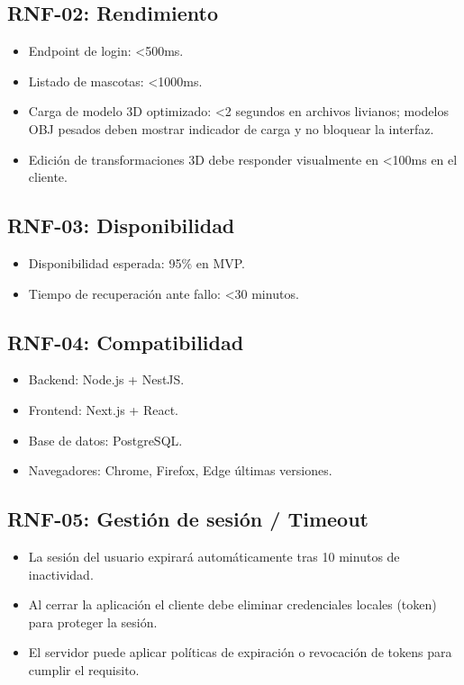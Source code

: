 \documentclass[12pt,a4paper]{article}
\begin{document}
\subsection{RNF-02: Rendimiento}
\begin{itemize}[leftmargin=*]
    \item Endpoint de login: <500ms.
    \item Listado de mascotas: <1000ms.
    \item Carga de modelo 3D optimizado: <2 segundos en archivos livianos; modelos OBJ pesados deben mostrar indicador de carga y no bloquear la interfaz.
    \item Edici\'on de transformaciones 3D debe responder visualmente en <100ms en el cliente.
\end{itemize}

\subsection{RNF-03: Disponibilidad}
\begin{itemize}[leftmargin=*]
    \item Disponibilidad esperada: 95\% en MVP.
    \item Tiempo de recuperaci\'on ante fallo: <30 minutos.
\end{itemize}

\subsection{RNF-04: Compatibilidad}
\begin{itemize}[leftmargin=*]
    \item Backend: Node.js + NestJS.
    \item Frontend: Next.js + React.
    \item Base de datos: PostgreSQL.
    \item Navegadores: Chrome, Firefox, Edge \'ultimas versiones.
\end{itemize}

\subsection{RNF-05: Gestión de sesión / Timeout}
\begin{itemize}[leftmargin=*]
    \item La sesión del usuario expirará automáticamente tras 10 minutos de inactividad.
    \item Al cerrar la aplicación el cliente debe eliminar credenciales locales (token) para proteger la sesión.
    \item El servidor puede aplicar políticas de expiraci\'on o revocaci\'on de tokens para cumplir el requisito.
\end{itemize}
\end{document}
